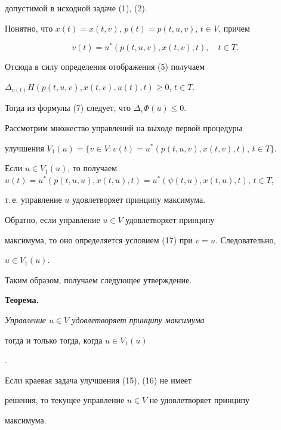 допустимой в исходной задаче (1), (2).





Понятно, что $x(t)=x(t,v)$, $p(t)=p(t,u,v)$, $t\in V$, причем


\begin{equation}


v(t)=u^*(p(t,u,v),x(t,v),t),\quad t\in T.


\end{equation}


Отсюда в силу определения отображения (5) получаем 


$\Delta_{v(t)}H(p(t,u,v),x(t,v),u(t),t)\ge0$, $t\in T$.


Тогда из формулы (7) следует, что $\Delta_v\Phi(u)\le0$.





Рассмотрим множество управлений на выходе первой процедуры


улучшения $V_1(u)=\{v\in V: v(t)=u^*(p(t,u,v),x(t,v),t)$, $t\in T\}$.


Если $u\in V_1(u)$, то получаем $u(t)=u^*(p(t,u,u),x(t,u),t)= 


u^*(\psi(t,u),x(t,u),t)$, $t\in T$,


т.\,е. управление $u$ удовлетворяет принципу максимума.





Обратно, если управление $u\in V$ удовлетворяет принципу 


максимума, то оно определяется условием (17) при $v=u$. Следовательно,


$u\in V_1(u)$.





Таким образом, получаем следующее утверждение.


\medskip





{\bf Теорема.} {\it Управление $u\in V$ удовлетворяет принципу максимума


тогда и только тогда, когда $u\in V_1(u)$}.





\begin{cor}


Если краевая задача улучшения (15), (16) не имеет 


решения, то текущее управление $u\in V$ не удовлетворяет принципу 


максимума.


\end{cor}





